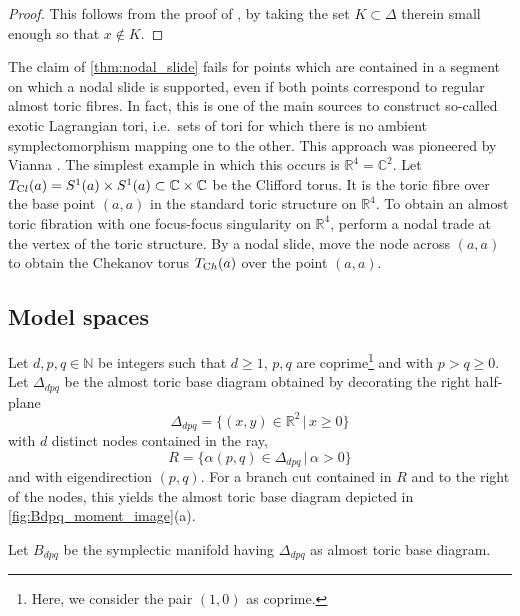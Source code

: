 \documentclass[12pt,a4paper,draft]{scrartcl}
\begin{document}
\begin{proof}
    This follows from the proof of \cite[Theorem 8.10]{evans2021atfs}, by taking the set $K \subset \Delta$ therein small enough so that $x \notin K$.
\end{proof}

\begin{remark}
    \label{rk:slides_ray}
    The claim of \cref{thm:nodal_slide} fails for points which are contained in a segment on which a nodal slide is supported, even if both points correspond to regular almost toric fibres. In fact, this is one of the main sources to construct so-called exotic Lagrangian tori, i.e.\ sets of tori for which there is no ambient symplectomorphism mapping one to the other. This approach was pioneered by Vianna \cite{Via16,Via17}. The simplest example in which this occurs is $\mathbb{R}^4 = \mathbb{C}^2$. Let $T_{\text Cl}(a) = S^1(a) \times S^1(a) \subset \mathbb{C} \times \mathbb{C}$ be the Clifford torus. It is the toric fibre over the base point $(a,a)$ in the standard toric structure on $\mathbb{R}^4$. To obtain an almost toric fibration with one focus-focus singularity on $\mathbb{R}^4$, perform a nodal trade at the vertex of the toric structure. By a nodal slide, move the node across $(a,a)$ to obtain the Chekanov torus $T_{\text Ch}(a)$ over the point $(a,a)$.
\end{remark}



\subsection{Model spaces}

Let $d,p,q \in \mathbb{N}$ be integers such that $d≥1$,   $p,q$ are coprime\footnote{Here, we consider the pair $(1,0)$ as coprime.} and with $p>q≥0$. Let $\Delta_{dpq}$ be the almost toric base diagram obtained by decorating the right half-plane
$$\Delta_{dpq} = \{ (x,y) \in \mathbb{R}^2 \, \vert \, x \geqslant 0 \}$$
with $d$ distinct nodes contained in the ray,
\begin{equation}
  \label{eqn:eigenline}
  R = \{\alpha (p,q) \in \Delta_{dpq} \, \vert \, \alpha > 0 \}
\end{equation}
and with eigendirection $(p,q)$. For a branch cut contained in $R$ and to the right of the nodes, this yields the almost toric base diagram depicted in \cref{fig:Bdpq_moment_image}(a). 

\begin{definition}
    \label{def:bdpq}
    Let $B_{dpq}$ be the symplectic manifold having $\Delta_{dpq}$ as almost toric base diagram. 
\end{definition}
\end{document}
